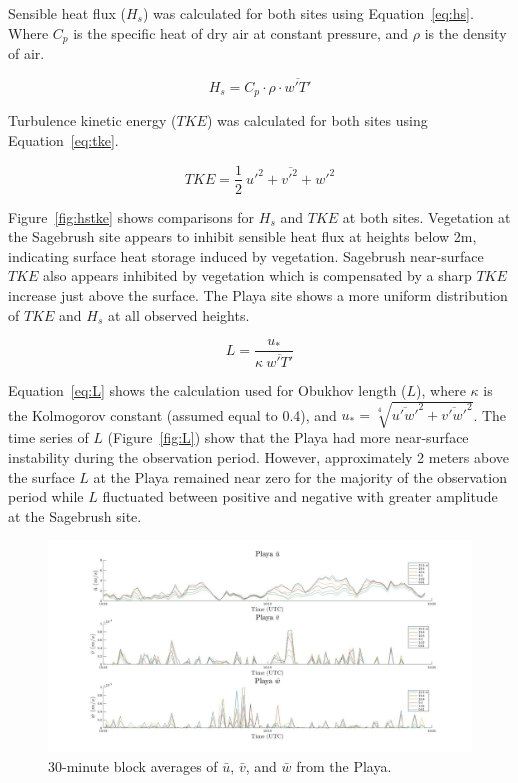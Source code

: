 \documentclass[]{article}
\begin{document}
Sensible heat flux ($H_s$) was calculated for both sites using Equation~\ref{eq:hs}. Where $C_p$ is the specific heat of dry air at constant pressure, and $\rho$ is the density of air.

\begin{equation}
H_s = C_p \cdot \rho \cdot \overline{w'T'}
\label{eq:hs}
\end{equation}

Turbulence kinetic energy ($TKE$) was calculated for both sites using Equation~\ref{eq:tke}. 

\begin{equation}
TKE = \frac{1}{2}~ \overline{u'^2 + v'^2 + w'^2}
\label{eq:tke}
\end{equation}

Figure~\ref{fig:hstke} shows comparisons for $H_s$ and $TKE$ at both sites. Vegetation at the Sagebrush site appears to inhibit sensible heat flux at heights below 2m, indicating surface heat storage induced by vegetation. Sagebrush near-surface $TKE$ also appears inhibited by vegetation which is compensated by a sharp $TKE$ increase just above the surface. The Playa site shows a more uniform distribution of $TKE$ and $H_s$ at all observed heights.

\begin{equation}
L = \frac{u_*}{\kappa~ \overline{w'T'}}
\label{eq:L}
\end{equation}

Equation~\ref{eq:L} shows the calculation used for Obukhov length ($L$), where $\kappa$ is the Kolmogorov constant (assumed equal to 0.4), and $u_* = \sqrt[4]{\overline{u'w'}^2 + \overline{v'w'}^2}$. The time series of $L$ (Figure~\ref{fig:L}) show that the Playa had more near-surface instability during the observation period. However, approximately 2 meters above the surface $L$ at the Playa remained near zero for the majority of the observation period while $L$ fluctuated between positive and negative with greater amplitude at the Sagebrush site. 

\begin{figure}
	\centering
	\includegraphics[width=\textwidth]{playarotate}
	\caption{30-minute block averages of $\bar{u}$, $\bar{v}$, and $\bar{w}$ from the Playa.}
	\label{fig:playarotate}
\end{figure}
\end{document}
